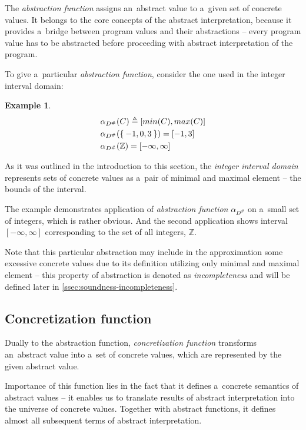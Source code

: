 \documentclass[12pt,oneside]{fithesis2}
\theoremstyle{definition}
\newtheorem{exmp}{Example}[section]
\begin{document}
The \textit{abstraction function} assigns an~abstract value to a~given set of concrete values. It belongs to the core concepts of the abstract interpretation, because it provides a~bridge between program values and their abstractions -- every program value has to be abstracted before proceeding with abstract interpretation of the program.

To give a~particular \textit{abstraction function}, consider the one used in the integer interval domain:

\begin{exmp}
  \begin{align*}
    &\alpha_{D^\#}(C) \triangleq [min(C), max(C)]\\
    &\alpha_{D^\#}(\Set{-1, 0, 3}) = [-1, 3]\\
    &\alpha_{D^\#}(\mathbb Z) = [-\infty, \infty]
  \end{align*}
\end{exmp}

As it was outlined in the introduction to this section, the \textit{integer interval domain} represents sets of concrete values as a~pair of minimal and maximal element -- the bounds of the interval.

The example demonstrates application of \textit{abstraction function} $\alpha_{D^\#}$ on a~small set of integers, which is rather obvious. And the second application shows interval $[-\infty, \infty]$ corresponding to the set of all integers, $\mathbb Z$.

Note that this particular abstraction may include in the approximation some excessive concrete values due to its definition utilizing only minimal and maximal element -- this property of abstraction is denoted as \textit{incompleteness} and will be defined later in \ref{ssec:soundness-incompleteness}.

\subsection{Concretization function}
Dually to the abstraction function, \textit{concretization function} transforms an~abstract value into a~set of concrete values, which are represented by the given abstract value.

Importance of this function lies in the fact that it defines a~concrete semantics of abstract values -- it enables us to translate results of abstract interpretation into the universe of concrete values. Together with abstract functions, it defines almost all subsequent terms of abstract interpretation.
\end{document}
